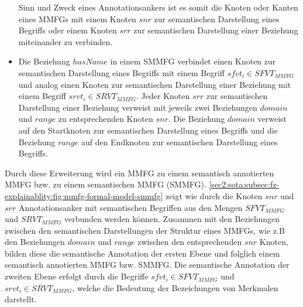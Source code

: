 \begin{itemize}
    Sinn und Zweck eines Annotationsankers ist es somit die Knoten oder Kanten eines MMFGs mit einem Knoten $snr$ zur semantischen Darstellung eines Begriffs oder einem Knoten $srr$ zur semantischen Darstellung einer Beziehung miteinander zu verbinden.
    \item Die Beziehung $hasName$ in einem SMMFG verbindet einen Knoten zur semantischen Darstellung eines Begriffs mit einem Begriff $sfvt_i \in SFVT_{MMFG}$ und analog einen Knoten zur semantischen Darstellung einer Beziehung mit einem Begriff $srvt_i \in SRVT_{MMFG}$.
    Jeder Knoten $srr$ zur semantischen Darstellung einer Beziehung verweist mit jeweils zwei Beziehungen $domain$ und $range$ zu entsprechenden Knoten $snr$.
    Die Beziehung $domain$ verweist auf den Startknoten zur semantischen Darstellung eines Begriffs und die Beziehung $range$ auf den Endknoten zur semantischen Darstellung eines Begriffs.
\end{itemize}
Durch diese Erweiterung wird ein MMFG zu einem semantisch annotierten MMFG bzw. zu einem semantischen MMFG (SMMFG).
\cref{sec2:sota:subsec:fz-explainablity:fig:mmfg-formal-model-smmfg} zeigt wie durch die Knoten $snr$ und $srr$ Annotationsanker mit semantischen Begriffen aus den Mengen $SFVT_{MMFG}$ und $SRVT_{MMFG}$ verbunden werden können.
Zusammen mit den Beziehungen zwischen den semantischen Darstellungen der Struktur eines MMFGs, wie z.B den Beziehungen $domain$ und $range$ zwischen den entsprechenden $snr$ Knoten, bilden diese die semantische Annotation der ersten Ebene und folglich einem semantisch annotierten MMFG bzw. SMMFG.
Die semantische Annotation der zweiten Ebene erfolgt durch die Begriffe $sfvt_i \in SFVT_{MMFG}$ und $srvt_i \in SRVT_{MMFG}$, welche die Bedeutung der Bezeichungen von Merkmalen darstellt. 

